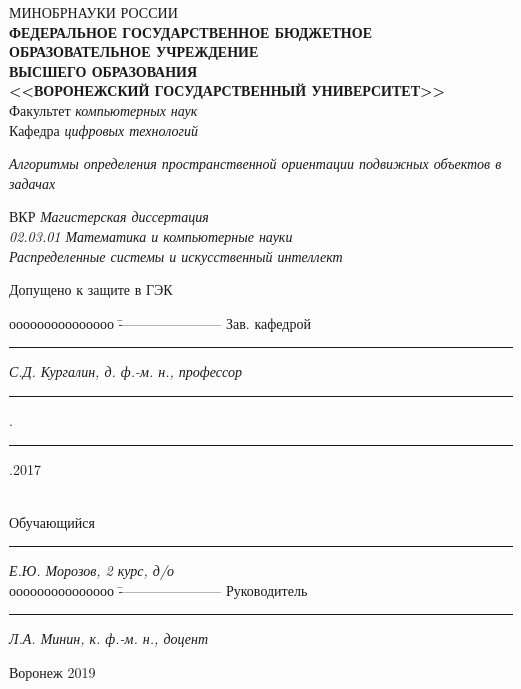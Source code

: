 \documentclass[../main.tex]{subfiles}
\begin{document}
\begin{spacing}{1.2}
{\sffamily \begin{small}
\thispagestyle{empty}
\center
{МИНОБРНАУКИ РОССИИ}\\ \!
{\footnotesize\textbf{ФЕДЕРАЛЬНОЕ ГОСУДАРСТВЕННОЕ БЮДЖЕТНОЕ ОБРАЗОВАТЕЛЬНОЕ УЧРЕЖДЕНИЕ}\\ \!\!\textbf{ВЫСШЕГО ОБРАЗОВАНИЯ}}\\ \!\!\!\!
\textbf{<<ВОРОНЕЖСКИЙ ГОСУДАРСТВЕННЫЙ УНИВЕРСИТЕТ>>}\\
\vspace{0.25cm}
{Факультет \textit{компьютерных наук}}\\
\vspace{0.25cm}
{Кафедра \textit{цифровых технологий}}\\

\vspace{1cm}

\textit{Алгоритмы определения пространственной ориентации подвижных объектов в задачах}\\

\vspace{1cm}

{ВКР} \textit{Магистерская диссертация}\\
\textit{02.03.01 Математика и компьютерные науки}\\
\textit{Распределенные системы и искусственный интеллект}\\

\vspace{4.0cm}
\begin{flushleft}
{Допущено к защите в ГЭК}
\end{flushleft}
\begin{tabbing}
ооооооооооооооо	\=	----------------------	\kill
Зав. кафедрой\> 	\rule[0mm]{3cm}{0,3mm}	\textit{С.Д. Кургалин, д. ф.-м. н., профессор}{ \rule[0mm]{5mm}{0,3mm}.\rule[0mm]{5mm}{0,3mm}.2017}  \\
Обучающийся \> 	\rule[0mm]{3cm}{0,3mm}	\textit{Е.Ю. Морозов, 2 курс, д/о} \\
ооооооооооооооо	\=	----------------------	\kill
Руководитель\> 	\rule[0mm]{3cm}{0,3mm}  \textit{Л.А. Минин, к. ф.-м. н., доцент}
\end{tabbing}

\vspace{2cm}

\centerline{Воронеж 2019}
\end{small}}
\end{spacing}
\clearpage
\end{document}

